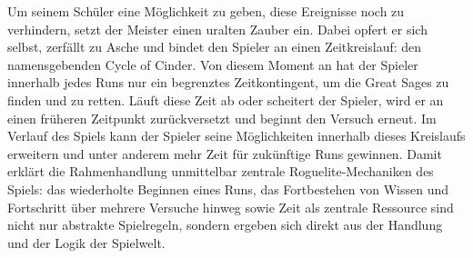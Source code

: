 Um seinem Schüler eine Möglichkeit zu geben, diese Ereignisse noch zu verhindern, setzt der Meister einen uralten Zauber ein. Dabei opfert er sich selbst, zerfällt zu Asche und bindet den Spieler an einen Zeitkreislauf: den namensgebenden Cycle of Cinder.
Von diesem Moment an hat der Spieler innerhalb jedes Runs nur ein begrenztes Zeitkontingent, um die Great Sages zu finden und zu retten. Läuft diese Zeit ab oder scheitert der Spieler, wird er an einen früheren Zeitpunkt zurückversetzt und beginnt den Versuch erneut. Im Verlauf des Spiels kann der Spieler seine Möglichkeiten innerhalb dieses Kreislaufs erweitern und unter anderem mehr Zeit für zukünftige Runs gewinnen.
Damit erklärt die Rahmenhandlung unmittelbar zentrale Roguelite-Mechaniken des Spiels: das wiederholte Beginnen eines Runs, das Fortbestehen von Wissen und Fortschritt über mehrere Versuche hinweg sowie Zeit als zentrale Ressource sind nicht nur abstrakte Spielregeln, sondern ergeben sich direkt aus der Handlung und der Logik der Spielwelt.
